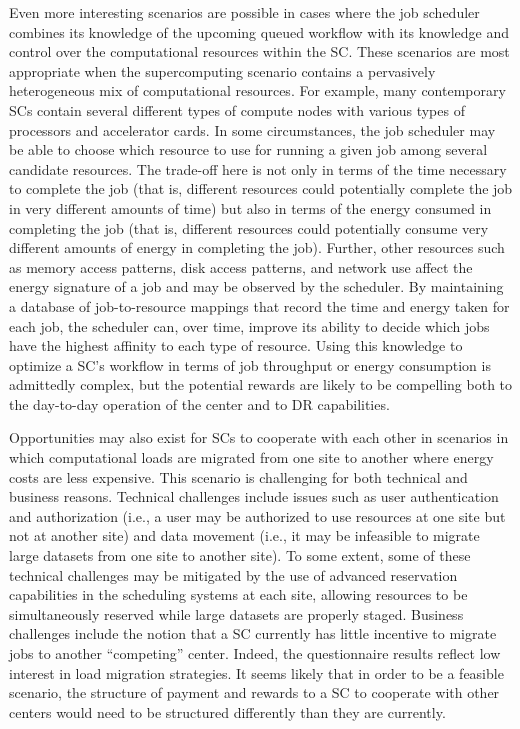 Even more interesting scenarios are possible in cases where the job
scheduler combines its knowledge of the upcoming queued workflow with
its knowledge and control over the computational resources within the
SC. These scenarios are most appropriate when the
supercomputing scenario contains a pervasively heterogeneous mix of
computational resources. For example, many contemporary SCs contain several different types of compute nodes with various
types of processors and accelerator cards. In some circumstances, the
job scheduler may be able to choose which resource to use for running
a given job among several candidate resources. The trade-off here is
not only in terms of the time necessary to complete the job (that is,
different resources could potentially complete the job in very
different amounts of time) but also in terms of the energy consumed in
completing the job (that is, different resources could potentially
consume very different amounts of energy in completing the job).
Further, other resources such as memory access patterns, disk access
patterns, and network use affect the energy signature of a job and may
be observed by the scheduler. By maintaining a database of
job-to-resource mappings that record the time and energy taken for
each job, the scheduler can, over time, improve its ability to decide
which jobs have the highest affinity to each type of resource. Using
this knowledge to optimize a SC's workflow in terms
of job throughput or energy consumption is admittedly complex, but the
potential rewards are likely to be compelling both to the day-to-day
operation of the center and to DR capabilities.

Opportunities may also exist for SCs to cooperate
with each other in scenarios in which computational loads are migrated
from one site to another where energy costs are less expensive. This
scenario is challenging for both technical and business reasons.
Technical challenges include issues such as user authentication and
authorization (i.e., a user may be authorized to use resources at one
site but not at another site) and data movement (i.e., it may be
infeasible to migrate large datasets from one site to another site).
To some extent, some of these technical challenges may be mitigated by
the use of advanced reservation capabilities in the scheduling systems
at each site, allowing resources to be simultaneously reserved while
large datasets are properly staged. Business challenges include the
notion that a SC currently has little incentive to
migrate jobs to another ``competing'' center. Indeed, the
questionnaire results reflect low interest in load migration
strategies. It seems likely that in order to be a feasible scenario,
the structure of payment and rewards to a SC to
cooperate with other centers would need to be structured differently
than they are currently.

